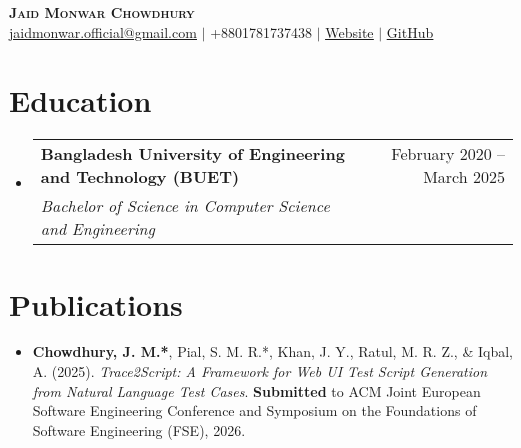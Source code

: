 \documentclass[letterpaper,12pt]{article} %
\makeatletter
\newcommand{\resumeSubheading}[4]{
  \vspace{-2pt}\item
    \begin{tabular*}{0.97\textwidth}[t]{l@{\extracolsep{\fill}}r}
      \textbf{#1} & #2 \\
      \textit{\small#3} & \textit{\small #4} \\
    \end{tabular*}\vspace{-7pt}
}
\newcommand{\resumeSubHeadingListStart}{\begin{itemize}[leftmargin=0.15in, label={}]}
\newcommand{\resumeSubHeadingListEnd}{\end{itemize}}
\makeatother
\begin{document}
\begin{center}
    \textbf{\Huge \scshape Jaid Monwar Chowdhury} \\ \vspace{1pt}
    \href{mailto:jaidmonwar.official@gmail.com}{\underline{jaidmonwar.official@gmail.com}} $|$ \small +8801781737438 $|$ \href{https://jaid-monwar.github.io}{\underline{Website}} $|$
    \href{https://github.com/jaid-monwar}{\underline{GitHub}}
\end{center}

\section{Education}
  \resumeSubHeadingListStart
    \resumeSubheading
      {Bangladesh University of Engineering and Technology (BUET)}{February 2020 -- March 2025}
      {Bachelor of Science in Computer Science and Engineering}{}
  \resumeSubHeadingListEnd

\section{Publications}
\begin{itemize}[leftmargin=0.15in, label={}]
    \item \small{\textbf{Chowdhury, J. M.*}, Pial, S. M. R.*, Khan, J. Y., Ratul, M. R. Z., \& Iqbal, A. (2025). \textit{Trace2Script: A Framework for Web UI Test Script Generation from Natural Language Test Cases}. \textbf{Submitted} to ACM Joint European Software Engineering Conference and Symposium on the Foundations of Software Engineering (FSE), 2026.}
\end{itemize}
\end{document}
